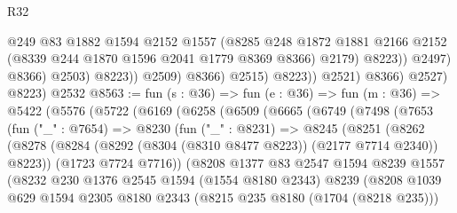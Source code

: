 \begin{lexlean}{R32}
\begin{coremodule}
                                    @249
                                    @83
                                    @1882
                                    @1594
                                    @2152
                                    @1557
                                    (@8285
                                      @248
                                      @1872
                                      @1881
                                      @2166
                                      @2152
                                      (@8339 @244 @1870 @1596 @2041 @1779 @8369 @8366)
                                      @2179)
                                    @8223))
                                @2497)
                              @8366)
                            @2503)
                          @8223))
                      @2509)
                    @8366)
                  @2515)
                @8223))
            @2521)
          @8366)
        @2527)
      @8223)
    @2532
@8563 := fun (s : @36) =>
  fun (e : @36) =>
  fun (m : @36) =>
  @5422
    (@5576
      (@5722
        (@6169
          (@6258
            (@6509
              (@6665
                (@6749
                  (@7498
                    (@7653
                      (fun ("_" : @7654) =>
                      @8230
                        (fun ("_" : @8231) =>
                        @8245
                          (@8251
                            (@8262
                              (@8278
                                (@8284
                                  (@8292 (@8304 (@8310 @8477 @8223)) (@2177 @7714 @2340))
                                  @8223))
                              (@1723 @7724 @7716))
                            (@8208
                              @1377
                              @83
                              @2547
                              @1594
                              @8239
                              @1557
                              (@8232
                                @230
                                @1376
                                @2545
                                @1594
                                (@1554 @8180 @2343)
                                @8239
                                (@8208
                                  @1039
                                  @629
                                  @1594
                                  @2305
                                  @8180
                                  @2343
                                  (@8215 @235 @8180 (@1704 (@8218 @235)))

\end{coremodule}
\end{lexlean}
